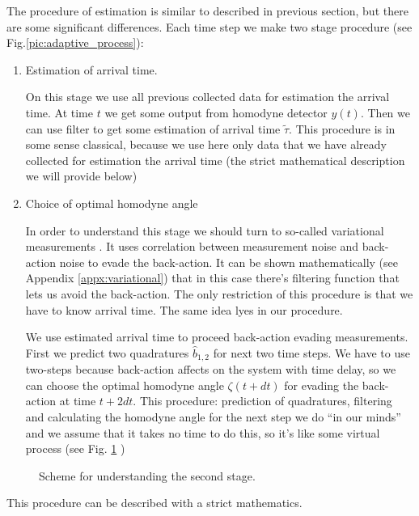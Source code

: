 The procedure of estimation is similar to described in previous section, but there are some significant differences.
Each time step we make two stage procedure (see Fig.\ref{pic:adaptive_process}):

\begin{enumerate}
 \item Estimation of arrival time.
  
On this stage we use all previous collected data for estimation the arrival time. At time $t$ we get some output from homodyne detector $y(t)$. Then we can use filter to get some estimation of arrival time $\tilde{\tau}$. This procedure is in some sense classical, because we use here only data that we have already collected for estimation the arrival time (the strict mathematical description we will provide below)
 \item Choice of optimal homodyne angle

In order to understand this stage we should turn to so-called variational measurements \cite{Vyatchanin1998m}. It uses correlation between measurement noise and back-action noise to evade the back-action. It can be shown mathematically (see Appendix \ref{appx:variational}) that in this case there's filtering function that lets us avoid the back-action.
The only restriction of this procedure is that we have to know arrival time. The same idea lyes in our procedure.

We use estimated arrival time to proceed back-action evading measurements. First we predict two quadratures $\hat{b}_{1,2}$ for next two time steps. We have to use two-steps because back-action affects on the system with time delay, so we can choose the optimal homodyne angle $\zeta(t+dt)$ for evading the back-action at time $t+2dt$. 
This procedure: prediction of quadratures, filtering and calculating the homodyne angle for the next step we do ``in our minds'' and we assume that it takes no time to do this, so it's like some virtual process (see Fig. \ref{pic:adaptive_virtual} )
\end{enumerate}
\begin{figure}
\caption{Scheme for understanding the second stage.}
\label{pic:adaptive_virtual}
\end{figure}

This procedure can be described with a strict mathematics.
